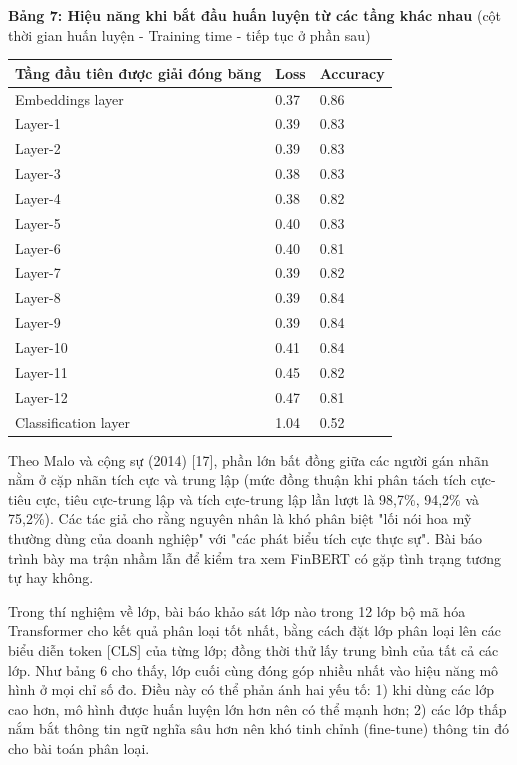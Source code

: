 \textbf{Bảng 7: Hiệu năng khi bắt đầu huấn luyện từ các tầng khác nhau} (cột thời gian huấn luyện - Training time - tiếp tục ở phần sau)

{\small
\begin{longtable}[]{@{}lll@{}}
\toprule\noalign{}
Tầng đầu tiên được giải đóng băng & Loss & Accuracy \\
\midrule\noalign{}
\endhead
\bottomrule\noalign{}
\endlastfoot
Embeddings layer & 0.37 & 0.86 \\
Layer-1 & 0.39 & 0.83 \\
Layer-2 & 0.39 & 0.83 \\
Layer-3 & 0.38 & 0.83 \\
Layer-4 & 0.38 & 0.82 \\
Layer-5 & 0.40 & 0.83 \\
Layer-6 & 0.40 & 0.81 \\
Layer-7 & 0.39 & 0.82 \\
Layer-8 & 0.39 & 0.84 \\
Layer-9 & 0.39 & 0.84 \\
Layer-10 & 0.41 & 0.84 \\
Layer-11 & 0.45 & 0.82 \\
Layer-12 & 0.47 & 0.81 \\
Classification layer & 1.04 & 0.52 \\
\end{longtable}
}

Theo Malo và cộng sự (2014) {[}17{]}, phần lớn bất đồng giữa các người gán nhãn nằm ở cặp nhãn tích cực và trung lập (mức đồng thuận khi phân tách tích cực-tiêu cực, tiêu cực-trung lập và tích cực-trung lập lần lượt là 98,7\%, 94,2\% và 75,2\%). Các tác giả cho rằng nguyên nhân là khó phân biệt "lối nói hoa mỹ thường dùng của doanh nghiệp" với "các phát biểu tích cực thực sự". Bài báo trình bày ma trận nhầm lẫn để kiểm tra xem FinBERT có gặp tình trạng tương tự hay không.

Trong thí nghiệm về lớp, bài báo khảo sát lớp nào trong 12 lớp bộ mã hóa Transformer cho kết quả phân loại tốt nhất, bằng cách đặt lớp phân loại lên các biểu diễn token {[}CLS{]} của từng lớp; đồng thời thử lấy trung bình của tất cả các lớp. Như bảng 6 cho thấy, lớp cuối cùng đóng góp nhiều nhất vào hiệu năng mô hình ở mọi chỉ số đo. Điều này có thể phản ánh hai yếu tố: 1) khi dùng các lớp cao hơn, mô hình được huấn luyện lớn hơn nên có thể mạnh hơn; 2) các lớp thấp nắm bắt thông tin ngữ nghĩa sâu hơn nên khó tinh chỉnh (fine-tune) thông tin đó cho bài toán phân loại.

